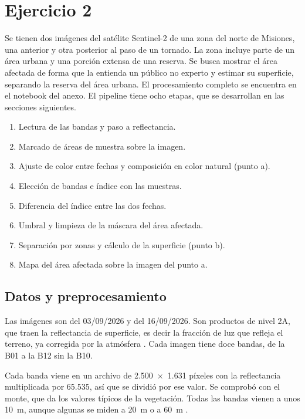 \section{Ejercicio 2}

    Se tienen dos imágenes del satélite Sentinel-2 de una zona del norte de Misiones, una anterior y otra posterior al paso de un tornado. La zona incluye parte de un área urbana y una porción extensa de una reserva. Se busca mostrar el área afectada de forma que la entienda un público no experto y estimar su superficie, separando la reserva del área urbana. El procesamiento completo se encuentra en el notebook del anexo. El pipeline tiene ocho etapas, que se desarrollan en las secciones siguientes.

    \begin{enumerate}
        \item Lectura de las bandas y paso a reflectancia.
        \item Marcado de áreas de muestra sobre la imagen.
        \item Ajuste de color entre fechas y composición en color natural (punto a).
        \item Elección de bandas e índice con las muestras.
        \item Diferencia del índice entre las dos fechas.
        \item Umbral y limpieza de la máscara del área afectada.
        \item Separación por zonas y cálculo de la superficie (punto b).
        \item Mapa del área afectada sobre la imagen del punto a.
    \end{enumerate}

    \subsection{Datos y preprocesamiento}

        Las imágenes son del 03/09/2026 y del 16/09/2026. Son productos de nivel 2A, que traen la reflectancia de superficie, es decir la fracción de luz que refleja el terreno, ya corregida por la atmósfera \cite{ej2_sentinel}. Cada imagen tiene doce bandas, de la B01 a la B12 sin la B10.

        Cada banda viene en un archivo de 2.500~$\times$~1.631 píxeles con la reflectancia multiplicada por 65.535, así que se dividió por ese valor. Se comprobó con el monte, que da los valores típicos de la vegetación. Todas las bandas vienen a unos 10~m, aunque algunas se miden a 20~m o a 60~m \cite{ej2_sentinel}.

